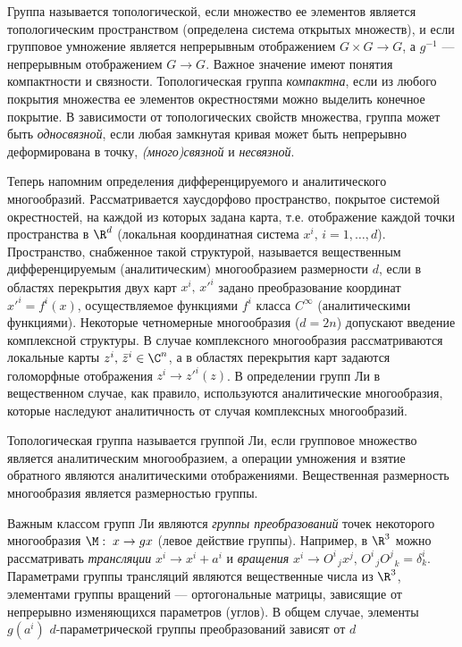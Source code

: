 \documentclass[a4paper
]{article}
\begin{document}
Группа называется топологической, если множество ее элементов
является топологическим пространством (определена система открытых
множеств), и если групповое умножение является непрерывным
отображением $G\times G\to G$, а $g^{-1}$ --- непрерывным
отображением $G\to G$. Важное значение имеют понятия компактности
и связности. Топологическая группа {\em компактна}, если из любого
покрытия множества ее элементов окрестностями можно выделить
конечное покрытие. В зависимости от топологических свойств
множества, группа может быть {\em односвязной}, если любая
замкнутая кривая может быть непрерывно деформирована в точку, {\em
(много)связной} и {\em несвязной}.\par Теперь напомним определения
дифференцируемого и аналитического многообразий. Рассматривается
хаусдорфово пространство, покрытое системой окрестностей, на
каждой из которых задана карта, т.е. отображение каждой точки
пространства в $\R^d$ (локальная координатная система
$x^i,\,i=1,\ldots, d$). Пространство, снабженное такой структурой,
называется вещественным дифференцируемым (аналитическим)
многообразием размерности $d$, если в областях перекрытия  двух
карт $x^i,\,{x'}^i$ задано преобразование координат
${x'}^i=f^i(x)$, осуществляемое функциями $f^i$ класса $C^\infty$
(аналитическими функциями). Некоторые четномерные многообразия
($d=2n$) допускают введение комплексной структуры. В случае
комплексного многообразия рассматриваются локальные карты
$z^i,\,{\bar z^i}\in \C^n$, а в областях перекрытия карт задаются
голоморфные отображения $z^i\to {z'}^i(z)$. В определении групп Ли
в вещественном случае, как правило, используются аналитические
многообразия, которые наследуют аналитичность от случая
комплексных многообразий.
\begin{Def}
Топологическая группа называется группой Ли, если групповое
множество является  аналитическим многообразием, а операции
умножения и взятие обратного являются аналитическими
отображениями. Вещественная размерность многообразия является
размерностью группы.
\end{Def}
Важным классом групп Ли являются {\em группы преобразований} точек
некоторого многообразия $\M:\; x\to g x$ (левое действие группы).
Например, в $\R^3$ можно рассматривать {\em трансляции} $x^i\to
x^i+a^i$ и {\em вращения} $x^i\to O^i_{\;\; j}x^j,\, O^i_{\;\;
j}O^j_{\;\; k}=\delta^i_k$. Параметрами группы трансляций являются
вещественные числа из $\R^3$, элементами группы вращений
--- ортогональные матрицы, зависящие от непрерывно изменяющихся
параметров (углов). В общем случае, элементы $g(a^i)$
$d$-параметрической группы преобразований зависят от $d$
\end{document}
